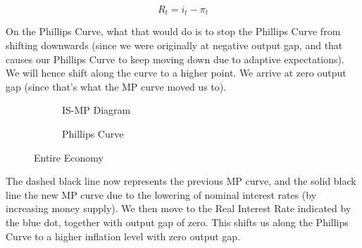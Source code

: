 \documentclass[11pt]{scrartcl}
\newcommand{\og}{\ensuremath{\tilde{Y}}}
\begin{document}
\[R_t = i_t - \pi_t\]

On the Phillips Curve, what that would do is to stop the Phillips Curve from shifting downwards (since we were originally at negative output gap, and that causes our Phillips Curve to keep moving down due to adaptive expectations). We will hence shift along the curve to a higher point. We arrive at zero output gap (since that's what the MP curve moved us to). 

\begin{figure}[H]
\begin{subfigure}[b]{0.5\textwidth}
\centering
{}
\caption{\color{blue}IS-\color{black}MP Diagram}
\end{subfigure}
\hspace{2ex}
\begin{subfigure}[b]{0.5\textwidth}
\centering
{}
\caption{Phillips Curve}
\end{subfigure}
\caption{Entire Economy}
\end{figure}

The dashed black line now represents the previous MP curve, and the solid black line the new MP curve due to the lowering of nominal interest rates (by increasing money supply). We then move to the Real Interest Rate indicated by the blue dot, together with output gap of zero. This shifts us along the Phillips Curve to a higher inflation level with zero output gap.
\end{document}
